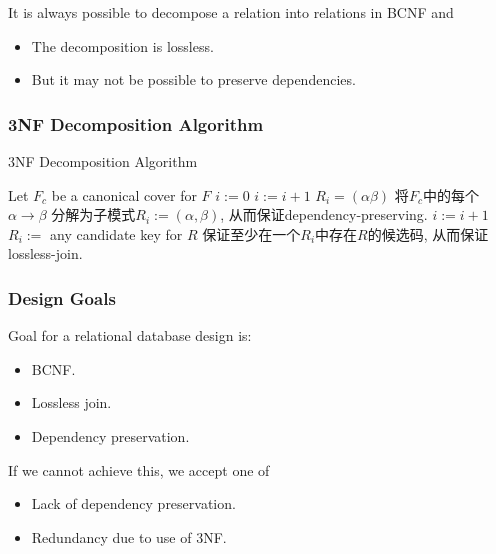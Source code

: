 It is always possible to decompose a relation into relations in BCNF and
\begin{itemize}\small
    \item The decomposition is lossless.
    \item But it may not be possible to preserve dependencies.
\end{itemize}

\subsubsection{3NF Decomposition Algorithm}

\begin{algorithm}[H]
    \caption{3NF Decomposition Algorithm}
    \begin{algorithmic}
        \State Let $F_c$ be a canonical cover for $F$
        \State $i:=0$
                \State $i:=i+1$
                \State $R_i=(\alpha\beta)$
                \Comment 将$F_c$中的每个$\alpha \rightarrow \beta$ 分解为子模式$R_i := (\alpha, \beta)$, 从而保证dependency-preserving.
            \EndIf
        \EndFor
            \State $i:=i+1$
            \State $R_i:=$ any candidate key for $R$ 
            \Comment 保证至少在一个$R_i$中存在$R$的候选码, 从而保证lossless-join.
        \EndIf
        \State {}
    \end{algorithmic}
\end{algorithm}


\subsubsection{Design Goals}
Goal for a relational database design is:
\begin{itemize}\small
    \item BCNF.
    \item Lossless join.
    \item Dependency preservation.
\end{itemize}

If we cannot achieve this, we accept one of
\begin{itemize}\small
    \item Lack of dependency preservation.
    \item Redundancy due to use of 3NF.
\end{itemize}

